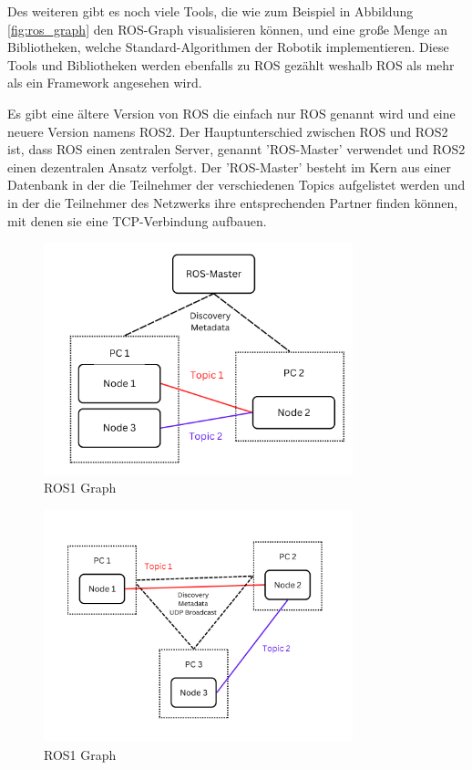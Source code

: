 \begin{flushleft}
\begin{description}
        Des weiteren gibt es noch viele Tools, die wie zum Beispiel in Abbildung \ref{fig:ros_graph} den ROS-Graph visualisieren können, und eine große Menge an Bibliotheken, welche Standard-Algorithmen der Robotik implementieren.
        Diese Tools und Bibliotheken werden ebenfalls zu ROS gezählt weshalb ROS als mehr als ein Framework angesehen wird.

        Es gibt eine ältere Version von ROS die einfach nur ROS genannt wird und eine neuere Version namens ROS2.
        Der Hauptunterschied zwischen ROS und ROS2 ist, dass ROS einen zentralen Server, genannt 'ROS-Master' verwendet und ROS2 einen dezentralen Ansatz verfolgt.
        Der 'ROS-Master' besteht im Kern aus einer Datenbank in der die Teilnehmer der verschiedenen Topics aufgelistet werden und in der die Teilnehmer des Netzwerks ihre entsprechenden Partner finden können, mit denen sie eine TCP-Verbindung aufbauen.
        
        \begin{figure}[h!]
            \centering
            \includegraphics[width=0.8\textwidth]{imgs/ROS1_concept_graph.png}
            \caption{ROS1 Graph}
            \label{fig:ros1_concept_graph}%
        \end{figure}

        \begin{figure}[h!]
            \centering
            \includegraphics[width=0.8\textwidth]{imgs/ROS2_concept_graph.png}
            \caption{ROS1 Graph}
            \label{fig:ros2_concept_graph}%
        \end{figure}


\end{description}
\end{flushleft}
